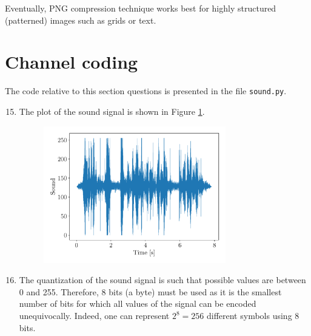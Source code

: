 \documentclass[a4paper, 12pt]{article}
\begin{document}
\begin{enumerate}[leftmargin=*]
\begin{enumerate}[label=(\alph*)]
            Eventually, PNG compression technique works best for highly structured (patterned) images such as grids or text.
        \end{enumerate}
    \end{enumerate}
    
    
    \section*{Channel coding}
    
    The code relative to this section questions is presented in the file \texttt{sound.py}.
    
    \begin{enumerate}[leftmargin=*]
        \setcounter{enumi}{14}
        
        \item The plot of the sound signal is shown in Figure \ref{fig:q15.soundwave}.
        
        \begin{figure}[H]
            \centering
            \includegraphics[width=0.75\textwidth]{resources/pdf/soundwave.pdf}
            \label{fig:q15.soundwave}
        \end{figure}
        
        
        \item The quantization of the sound signal is such that possible values are between 0 and 255. Therefore, 8 bits (a byte) must be used as it is the smallest number of bits for which all values of the signal can be encoded unequivocally. Indeed, one can represent $2^8 = 256$ different symbols using 8 bits.
        

\end{enumerate}
\end{document}
